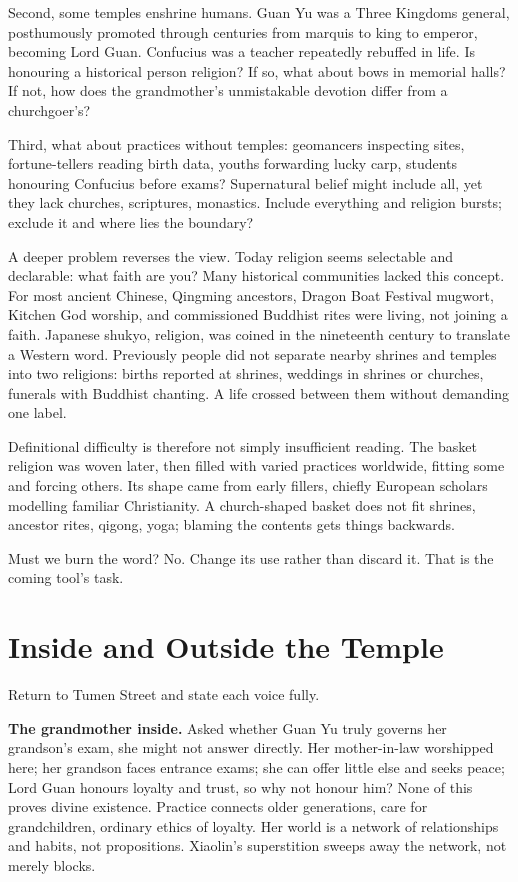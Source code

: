 Second, some temples enshrine humans. Guan Yu was a Three Kingdoms general, posthumously promoted through centuries from marquis to king to emperor, becoming Lord Guan. Confucius was a teacher repeatedly rebuffed in life. Is honouring a historical person religion? If so, what about bows in memorial halls? If not, how does the grandmother's unmistakable devotion differ from a churchgoer's?

Third, what about practices without temples: geomancers inspecting sites, fortune-tellers reading birth data, youths forwarding lucky carp, students honouring Confucius before exams? Supernatural belief might include all, yet they lack churches, scriptures, monastics. Include everything and religion bursts; exclude it and where lies the boundary?

A deeper problem reverses the view. Today religion seems selectable and declarable: what faith are you? Many historical communities lacked this concept. For most ancient Chinese, Qingming ancestors, Dragon Boat Festival mugwort, Kitchen God worship, and commissioned Buddhist rites were living, not joining a faith. Japanese shukyo, religion, was coined in the nineteenth century to translate a Western word. Previously people did not separate nearby shrines and temples into two religions: births reported at shrines, weddings in shrines or churches, funerals with Buddhist chanting. A life crossed between them without demanding one label.

Definitional difficulty is therefore not simply insufficient reading. The basket religion was woven later, then filled with varied practices worldwide, fitting some and forcing others. Its shape came from early fillers, chiefly European scholars modelling familiar Christianity. A church-shaped basket does not fit shrines, ancestor rites, qigong, yoga; blaming the contents gets things backwards.

Must we burn the word? No. Change its use rather than discard it. That is the coming tool's task.

\section{Inside and Outside the Temple}
Return to Tumen Street and state each voice fully.

\textbf{The grandmother inside.} Asked whether Guan Yu truly governs her grandson's exam, she might not answer directly. Her mother-in-law worshipped here; her grandson faces entrance exams; she can offer little else and seeks peace; Lord Guan honours loyalty and trust, so why not honour him? None of this proves divine existence. Practice connects older generations, care for grandchildren, ordinary ethics of loyalty. Her world is a network of relationships and habits, not propositions. Xiaolin's superstition sweeps away the network, not merely blocks.

